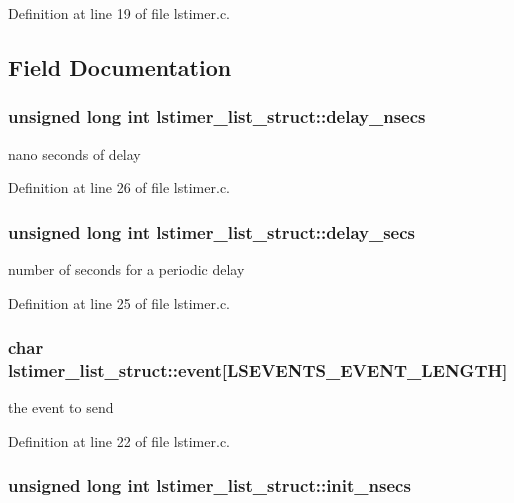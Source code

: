 Definition at line 19 of file lstimer.c.

\subsection{Field Documentation}
\hypertarget{structlstimer__list__struct_acb0c6a1600c4168e5dfb2d477a685b29}{
\subsubsection[{delay\_\-nsecs}]{\setlength{\rightskip}{0pt plus 5cm}unsigned long int {\bf lstimer\_\-list\_\-struct::delay\_\-nsecs}}}
\label{structlstimer__list__struct_acb0c6a1600c4168e5dfb2d477a685b29}


nano seconds of delay 

Definition at line 26 of file lstimer.c.\hypertarget{structlstimer__list__struct_a237da48d81b7e039c54901296aeee18e}{
\subsubsection[{delay\_\-secs}]{\setlength{\rightskip}{0pt plus 5cm}unsigned long int {\bf lstimer\_\-list\_\-struct::delay\_\-secs}}}
\label{structlstimer__list__struct_a237da48d81b7e039c54901296aeee18e}


number of seconds for a periodic delay 

Definition at line 25 of file lstimer.c.\hypertarget{structlstimer__list__struct_a54d564e392315b2730278bb925803184}{
\subsubsection[{event}]{\setlength{\rightskip}{0pt plus 5cm}char {\bf lstimer\_\-list\_\-struct::event}\mbox{[}LSEVENTS\_\-EVENT\_\-LENGTH\mbox{]}}}
\label{structlstimer__list__struct_a54d564e392315b2730278bb925803184}


the event to send 

Definition at line 22 of file lstimer.c.\hypertarget{structlstimer__list__struct_ad5bb7fa7d669b7ebbe34d8ed2bdb257a}{
\subsubsection[{init\_\-nsecs}]{\setlength{\rightskip}{0pt plus 5cm}unsigned long int {\bf lstimer\_\-list\_\-struct::init\_\-nsecs}}}
\label{structlstimer__list__struct_ad5bb7fa7d669b7ebbe34d8ed2bdb257a}


